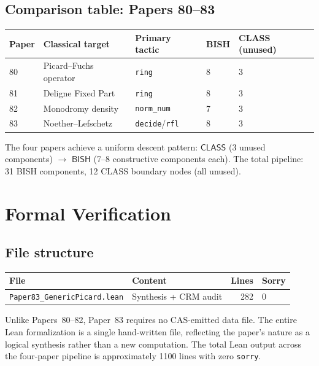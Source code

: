 \documentclass[11pt]{article}
\theoremstyle{plain}
\theoremstyle{definition}
\theoremstyle{remark}
\newcommand{\BISH}{\mathsf{BISH}}
\newcommand{\CLASS}{\mathsf{CLASS}}
\begin{document}
\subsection{Comparison table: Papers 80--83}

\begin{center}
\renewcommand{\arraystretch}{1.1}
\begin{tabular}{@{}llllp{3cm}@{}}
\toprule
Paper & Classical target & Primary tactic & BISH & CLASS (unused) \\
\midrule
80 & Picard--Fuchs operator & \texttt{ring} & 8 & 3 \\
81 & Deligne Fixed Part & \texttt{ring} & 8 & 3 \\
82 & Monodromy density & \texttt{norm\_num} & 7 & 3 \\
83 & Noether--Lefschetz & \texttt{decide}/\texttt{rfl} & 8 & 3 \\
\bottomrule
\end{tabular}
\end{center}

\noindent
The four papers achieve a uniform descent pattern: $\CLASS$ (3 unused components) $\to$ $\BISH$ (7--8 constructive components each).
The total pipeline: 31 BISH components, 12 CLASS boundary nodes (all unused).

\section{Formal Verification}
\label{sec:formal}

\subsection{File structure}

\begin{center}
\renewcommand{\arraystretch}{1.05}
\begin{tabular}{@{}llrl@{}}
\toprule
File & Content & Lines & Sorry \\
\midrule
\texttt{Paper83\_GenericPicard.lean} & Synthesis + CRM audit & 282 & 0 \\
\bottomrule
\end{tabular}
\end{center}

Unlike Papers~80--82, Paper~83 requires no CAS-emitted data file.
The entire Lean formalization is a single hand-written file, reflecting the paper's nature as a logical synthesis rather than a new computation.
The total Lean output across the four-paper pipeline is approximately 1100 lines with zero \texttt{sorry}.
\end{document}
